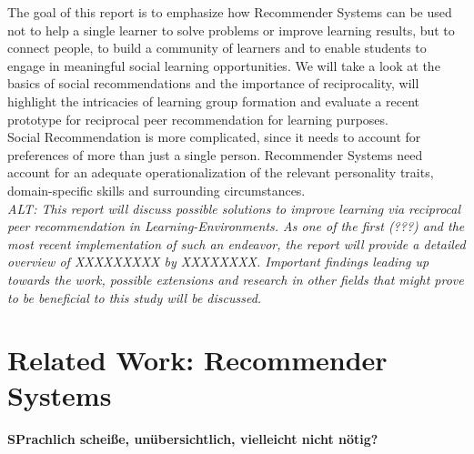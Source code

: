 \documentclass[nochapterpage,bigchapter,linedtoc,longdoc,colorback,accentcolor=tud3b,oneside]{tudreport}
\begin{document}
The goal of this report is to emphasize how Recommender Systems can be used not to help a single learner to solve problems or improve learning results, but to connect people, to build a community of learners and to enable students to engage in meaningful social learning opportunities. We will take a look at the basics of social recommendations and the importance of reciprocality, will highlight the intricacies of learning group formation and evaluate a recent prototype for reciprocal peer recommendation for learning purposes.\\
Social Recommendation is more complicated, since it needs to account for preferences of more than just a single person. Recommender Systems need account for an adequate operationalization of the relevant personality traits, domain-specific skills and surrounding circumstances.\\
\textit{ALT: This report will discuss possible solutions to improve learning via reciprocal peer recommendation in Learning-Environments. As one of the first (???) and the most recent implementation of such an endeavor, the report will provide a detailed overview of XXXXXXXXX by XXXXXXXX. Important findings leading up towards the work, possible extensions and research in other fields that might prove to be beneficial to this study will be discussed.}\\

\chapter{Related Work: Recommender Systems}
\textbf{SPrachlich scheiße, unübersichtlich, vielleicht nicht nötig?}
\end{document}

